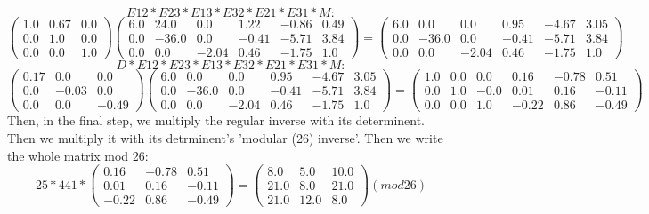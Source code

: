 \documentclass{article}%
\begin{document}
\newline%
%
\[%
E12 * E23 * E13 * E32 * E21 * E31 * M:%
\]%
\[%
\begin{pmatrix}%
1.0&0.67&0.0\\%
0.0&1.0&0.0\\%
0.0&0.0&1.0%
\end{pmatrix} \begin{pmatrix}%
6.0&24.0&0.0&1.22&-0.86&0.49\\%
0.0&-36.0&0.0&-0.41&-5.71&3.84\\%
0.0&0.0&-2.04&0.46&-1.75&1.0%
\end{pmatrix} = \begin{pmatrix}%
6.0&0.0&0.0&0.95&-4.67&3.05\\%
0.0&-36.0&0.0&-0.41&-5.71&3.84\\%
0.0&0.0&-2.04&0.46&-1.75&1.0%
\end{pmatrix}%
\]%
\newline%
%
\[%
D * E12 * E23 * E13 * E32 * E21 * E31 * M:%
\]%
\[%
\begin{pmatrix}%
0.17&0.0&0.0\\%
0.0&-0.03&0.0\\%
0.0&0.0&-0.49%
\end{pmatrix} \begin{pmatrix}%
6.0&0.0&0.0&0.95&-4.67&3.05\\%
0.0&-36.0&0.0&-0.41&-5.71&3.84\\%
0.0&0.0&-2.04&0.46&-1.75&1.0%
\end{pmatrix} = \begin{pmatrix}%
1.0&0.0&0.0&0.16&-0.78&0.51\\%
0.0&1.0&-0.0&0.01&0.16&-0.11\\%
0.0&0.0&1.0&-0.22&0.86&-0.49%
\end{pmatrix}%
\]%
\newline%
%
Then, in the final step, we multiply the regular inverse with its determinent. Then we multiply it with its detrminent's 'modular (26) inverse'. Then we write the whole matrix mod 26:%
\[%
25 * 441 *  \begin{pmatrix}%
0.16&-0.78&0.51\\%
0.01&0.16&-0.11\\%
-0.22&0.86&-0.49%
\end{pmatrix} = \begin{pmatrix}%
8.0&5.0&10.0\\%
21.0&8.0&21.0\\%
21.0&12.0&8.0%
\end{pmatrix} (mod  26)%
\]%
\newline%
\end{document}
